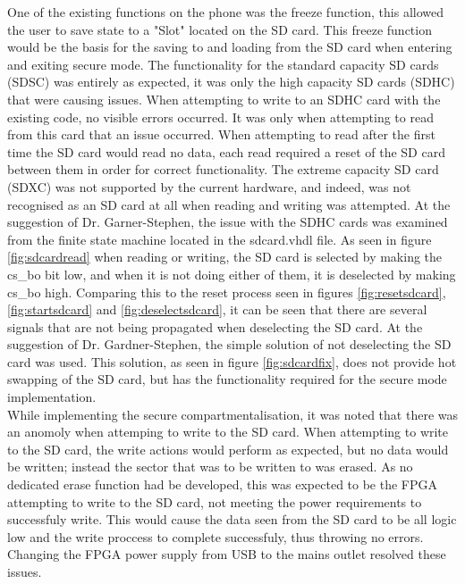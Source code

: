 One of the existing functions on the phone was the freeze function, this allowed the user to save state to a "Slot" located on the SD card. This freeze function would be the basis for the saving to and loading from the SD card when entering and exiting secure mode. The functionality for the standard capacity SD cards (SDSC) was entirely as expected, it was only the high capacity SD cards (SDHC) that were causing issues. When attempting to write to an SDHC card with the existing code, no visible errors occurred. It was only when attempting to read from this card that an issue occurred. When attempting to read after the first time the SD card would read no data, each read required a reset of the SD card between them in order for correct functionality. The extreme capacity SD card (SDXC) was not supported by the current hardware, and indeed, was not recognised as an SD card at all when reading and writing was attempted. At the suggestion of Dr. Garner-Stephen, the issue with the SDHC cards was examined from the finite state machine located in the sdcard.vhdl file. As seen in figure \ref{fig:sdcardread} when reading or writing, the SD card is selected by making the cs\_bo bit low, and when it is not doing either of them, it is deselected by making cs\_bo high. Comparing this to the reset process seen in figures \ref{fig:resetsdcard}, \ref{fig:startsdcard} and \ref{fig:deselectsdcard}, it can be seen that there are several signals that are not being propagated when deselecting the SD card. At the suggestion of Dr. Gardner-Stephen, the simple solution of not deselecting the SD card was used. This solution, as seen in figure \ref{fig:sdcardfix}, does not provide hot swapping of the SD card, but has the functionality required for the secure mode implementation.\\

While implementing the secure compartmentalisation, it was noted that there was an anomoly when attemping to write to the SD card. When attempting to write to the SD card, the write actions would perform as expected, but no data would be written; instead the sector that was to be written to was erased. As no dedicated erase function had be developed, this was expected to be the FPGA attempting to write to the SD card, not meeting the power requirements to successfuly write. This would cause the data seen from the SD card to be all logic low and the write proccess to complete successfuly, thus throwing no errors. Changing the FPGA power supply from USB to the mains outlet resolved these issues.

